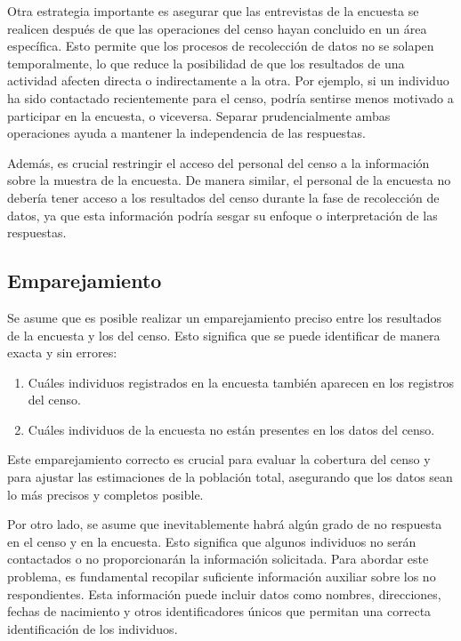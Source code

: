 \documentclass[
  12pt,
]{book}
\providecommand{\tightlist}{%
  \setlength{\itemsep}{0pt}\setlength{\parskip}{0pt}}
\begin{document}
Otra estrategia importante es asegurar que las entrevistas de la encuesta se realicen después de que las operaciones del censo hayan concluido en un área específica. Esto permite que los procesos de recolección de datos no se solapen temporalmente, lo que reduce la posibilidad de que los resultados de una actividad afecten directa o indirectamente a la otra. Por ejemplo, si un individuo ha sido contactado recientemente para el censo, podría sentirse menos motivado a participar en la encuesta, o viceversa. Separar prudencialmente ambas operaciones ayuda a mantener la independencia de las respuestas.

Además, es crucial restringir el acceso del personal del censo a la información sobre la muestra de la encuesta. De manera similar, el personal de la encuesta no debería tener acceso a los resultados del censo durante la fase de recolección de datos, ya que esta información podría sesgar su enfoque o interpretación de las respuestas.

\hypertarget{emparejamiento}{%
\subsection{Emparejamiento}\label{emparejamiento}}

Se asume que es posible realizar un emparejamiento preciso entre los resultados de la encuesta y los del censo. Esto significa que se puede identificar de manera exacta y sin errores:

\begin{enumerate}
\def\labelenumi{\arabic{enumi}.}
\tightlist
\item
  Cuáles individuos registrados en la encuesta también aparecen en los registros del censo.
\item
  Cuáles individuos de la encuesta no están presentes en los datos del censo.
\end{enumerate}

Este emparejamiento correcto es crucial para evaluar la cobertura del censo y para ajustar las estimaciones de la población total, asegurando que los datos sean lo más precisos y completos posible.

Por otro lado, se asume que inevitablemente habrá algún grado de no respuesta en el censo y en la encuesta. Esto significa que algunos individuos no serán contactados o no proporcionarán la información solicitada. Para abordar este problema, es fundamental recopilar suficiente información auxiliar sobre los no respondientes. Esta información puede incluir datos como nombres, direcciones, fechas de nacimiento y otros identificadores únicos que permitan una correcta identificación de los individuos.
\end{document}
